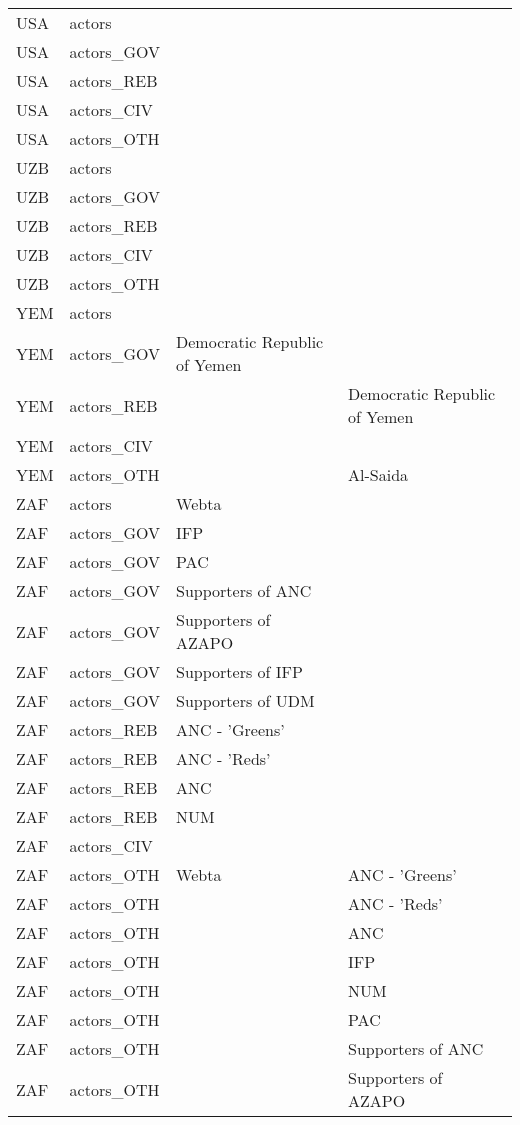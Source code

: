 \begin{table}[ht]
\begin{tabular}{llll}
  USA & actors &  &  \\ 
  USA & actors\_GOV &  &  \\ 
  USA & actors\_REB &  &  \\ 
  USA & actors\_CIV &  &  \\ 
  USA & actors\_OTH &  &  \\ 
  UZB & actors &  &  \\ 
  UZB & actors\_GOV &  &  \\ 
  UZB & actors\_REB &  &  \\ 
  UZB & actors\_CIV &  &  \\ 
  UZB & actors\_OTH &  &  \\ 
  YEM & actors &  &  \\ 
  YEM & actors\_GOV & Democratic Republic of Yemen &  \\ 
  YEM & actors\_REB &  & Democratic Republic of Yemen \\ 
  YEM & actors\_CIV &  &  \\ 
  YEM & actors\_OTH &  & Al-Saida \\ 
  ZAF & actors & Webta &  \\ 
  ZAF & actors\_GOV & IFP &  \\ 
  ZAF & actors\_GOV & PAC &  \\ 
  ZAF & actors\_GOV & Supporters of ANC &  \\ 
  ZAF & actors\_GOV & Supporters of AZAPO &  \\ 
  ZAF & actors\_GOV & Supporters of IFP &  \\ 
  ZAF & actors\_GOV & Supporters of UDM &  \\ 
  ZAF & actors\_REB & ANC - 'Greens' &  \\ 
  ZAF & actors\_REB & ANC - 'Reds' &  \\ 
  ZAF & actors\_REB & ANC &  \\ 
  ZAF & actors\_REB & NUM &  \\ 
  ZAF & actors\_CIV &  &  \\ 
  ZAF & actors\_OTH & Webta & ANC - 'Greens' \\ 
  ZAF & actors\_OTH &  & ANC - 'Reds' \\ 
  ZAF & actors\_OTH &  & ANC \\ 
  ZAF & actors\_OTH &  & IFP \\ 
  ZAF & actors\_OTH &  & NUM \\ 
  ZAF & actors\_OTH &  & PAC \\ 
  ZAF & actors\_OTH &  & Supporters of ANC \\ 
  ZAF & actors\_OTH &  & Supporters of AZAPO \\ 

\end{tabular}
\end{table}
